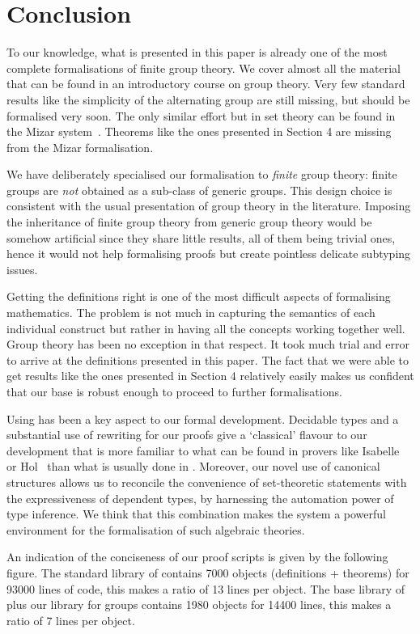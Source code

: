 \section{Conclusion}


To our knowledge, what is presented in this paper is already one of the most
complete formalisations of finite group theory. 
We cover almost all the material that can be found in an introductory course on 
group theory. Very few standard results like the simplicity
of the alternating group are still missing, but should be formalised very soon.
The only similar effort but in set theory
can be found in the Mizar system~\cite{Mizar}. Theorems like the ones
presented in Section 4 are missing from the Mizar formalisation.

We have deliberately specialised our formalisation to \emph{finite}
group theory: finite groups are \emph{not} obtained as a sub-class of
generic groups.
This design choice
is consistent with the usual presentation of group theory in the literature.
Imposing the inheritance of finite group
theory from generic group theory would be somehow artificial since they share
little results, all of them being trivial ones, hence it would not
help formalising proofs but create pointless delicate subtyping issues.  

Getting the definitions right is one of the most difficult aspects of
formalising mathematics. The problem is not much in capturing the 
semantics of each individual construct but rather in having all the concepts 
working together well. Group theory has been no exception in that respect.
It took much trial and error to arrive at the definitions 
presented in this paper. The fact that we were able to get 
results like the ones presented in Section 4 relatively
easily makes us confident 
that our base is robust enough to proceed to further formalisations.

Using \ssr{} has been a key aspect to our formal
development. Decidable types and a substantial use of rewriting for our proofs
give a `classical' flavour to our development that is more familiar
to what can be found in provers like {\sc Isabelle}~\cite{Isabelle} or
{\sc Hol}~\cite{Hol} than what is usually done in \Coq. Moreover, our novel use of canonical structures allows us to reconcile the convenience of
set-theoretic statements with the expressiveness of dependent types, by harnessing the automation power of type inference. We think that
this combination makes the \Coq{} system a powerful environment for
the formalisation of such algebraic theories.




An indication of the conciseness of our proof scripts
is given by the following figure. The standard library of \Coq{} contains
7000 objects (definitions + theorems) for  93000 lines of code, this makes a ratio of 
13 lines per object. The base library of \ssr{} plus our library for groups contains
1980 objects for 14400 lines, this makes a ratio of 7 lines per object.


